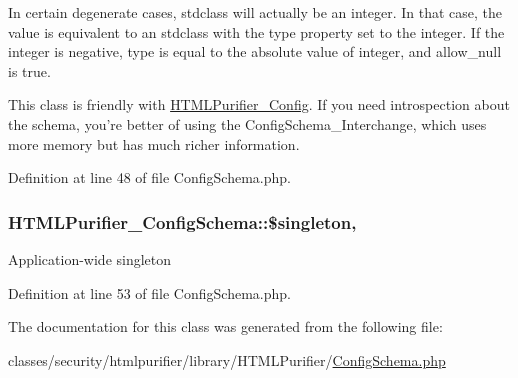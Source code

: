 In certain degenerate cases, stdclass will actually be an integer. In that case, the value is equivalent to an stdclass with the type property set to the integer. If the integer is negative, type is equal to the absolute value of integer, and allow\+\_\+null is true.

This class is friendly with \hyperlink{classHTMLPurifier__Config}{H\+T\+M\+L\+Purifier\+\_\+\+Config}. If you need introspection about the schema, you're better of using the Config\+Schema\+\_\+\+Interchange, which uses more memory but has much richer information. 

Definition at line 48 of file Config\+Schema.\+php.

\hypertarget{classHTMLPurifier__ConfigSchema_a60d289f46f786502bc0b15322ba5de8e}{
\subsubsection[{\$singleton}]{\setlength{\rightskip}{0pt plus 5cm}H\+T\+M\+L\+Purifier\+\_\+\+Config\+Schema\+::\$singleton\hspace{0.3cm}{\ttfamily [static]}, {\ttfamily [protected]}}}\label{classHTMLPurifier__ConfigSchema_a60d289f46f786502bc0b15322ba5de8e}
Application-\/wide singleton 

Definition at line 53 of file Config\+Schema.\+php.



The documentation for this class was generated from the following file\+:\begin{DoxyCompactItemize}
\item 
classes/security/htmlpurifier/library/\+H\+T\+M\+L\+Purifier/\hyperlink{ConfigSchema_8php}{Config\+Schema.\+php}\end{DoxyCompactItemize}
